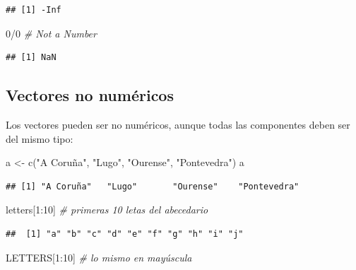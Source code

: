 \documentclass[
]{book}
\newenvironment{Shaded}{\begin{snugshade}}{\end{snugshade}}
\newcommand{\CommentTok}[1]{\textcolor[rgb]{0.56,0.35,0.01}{\textit{#1}}}
\newcommand{\DecValTok}[1]{\textcolor[rgb]{0.00,0.00,0.81}{#1}}
\newcommand{\FunctionTok}[1]{\textcolor[rgb]{0.00,0.00,0.00}{#1}}
\newcommand{\NormalTok}[1]{#1}
\newcommand{\OtherTok}[1]{\textcolor[rgb]{0.56,0.35,0.01}{#1}}
\newcommand{\SpecialCharTok}[1]{\textcolor[rgb]{0.00,0.00,0.00}{#1}}
\newcommand{\StringTok}[1]{\textcolor[rgb]{0.31,0.60,0.02}{#1}}
\theoremstyle{break}
\theoremstyle{nonumberplain}
\begin{document}
\begin{verbatim}
## [1] -Inf
\end{verbatim}

\begin{Shaded}
\begin{Highlighting}[]
\DecValTok{0}\SpecialCharTok{/}\DecValTok{0}  \CommentTok{\# Not a Number}
\end{Highlighting}
\end{Shaded}

\begin{verbatim}
## [1] NaN
\end{verbatim}

\hypertarget{vectores-no-numuxe9ricos}{%
\subsection{Vectores no numéricos}\label{vectores-no-numuxe9ricos}}

Los vectores pueden ser no numéricos, aunque todas las componentes deben ser del mismo tipo:

\begin{Shaded}
\begin{Highlighting}[]
\NormalTok{a }\OtherTok{\textless{}{-}} \FunctionTok{c}\NormalTok{(}\StringTok{"A Coruña"}\NormalTok{, }\StringTok{"Lugo"}\NormalTok{, }\StringTok{"Ourense"}\NormalTok{, }\StringTok{"Pontevedra"}\NormalTok{)}
\NormalTok{a}
\end{Highlighting}
\end{Shaded}

\begin{verbatim}
## [1] "A Coruña"   "Lugo"       "Ourense"    "Pontevedra"
\end{verbatim}

\begin{Shaded}
\begin{Highlighting}[]
\NormalTok{letters[}\DecValTok{1}\SpecialCharTok{:}\DecValTok{10}\NormalTok{]  }\CommentTok{\# primeras 10 letas del abecedario}
\end{Highlighting}
\end{Shaded}

\begin{verbatim}
##  [1] "a" "b" "c" "d" "e" "f" "g" "h" "i" "j"
\end{verbatim}

\begin{Shaded}
\begin{Highlighting}[]
\NormalTok{LETTERS[}\DecValTok{1}\SpecialCharTok{:}\DecValTok{10}\NormalTok{]  }\CommentTok{\# lo mismo en mayúscula}
\end{Highlighting}
\end{Shaded}
\end{document}
